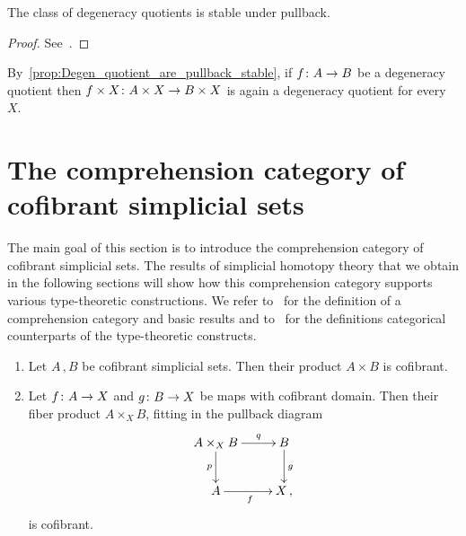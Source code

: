 \documentclass[reqno,10pt,a4paper,oneside,draft]{amsart}
\begin{document}
\begin{proposition}
\label{prop:Degen_quotient_are_pullback_stable}
The class of degeneracy quotients is stable under pullback. 
\end{proposition}

\begin{proof} See~\cite[Proposition 3.1.11]{henry2019qms}.
\end{proof}

By~\cref{prop:Degen_quotient_are_pullback_stable}, if $f \colon A \rightarrow B$ be a degeneracy quotient  then $f \times X \colon A \times X \rightarrow B \times X$ is again a degeneracy quotient for every $X$.


\section{The comprehension category of cofibrant simplicial sets}
\label{sec:basrp}

The main goal of this section is to introduce the comprehension category of cofibrant simplicial sets. The
results of simplicial homotopy theory that we obtain in the following sections will show how this 
comprehension category supports various type-theoretic constructions. We refer to~\cite{JacobsB:catltt} for the definition of a comprehension category and basic results and to~\cite{LumsdaineP:locuoc} for the
definitions categorical counterparts of the type-theoretic constructs.  


\begin{lemma}\label{lem:cofibrant_fiber_product} \hfill 
\begin{enumerate}[$(i)$] 
\item Let $A \, , B$ be cofibrant simplicial sets. Then their product $A \times B$ is cofibrant.
\item Let $f \colon A \to X$ and $g \colon B \to X$ be maps with  cofibrant domain. Then their
fiber product $A \times_X B$, fitting in the pullback diagram
\[
\xymatrix{
A \times_X B \ar[r]^-{q} \ar[d]_-{p} & B \ar[d]^g \\
A \ar[r]_f & X \, ,}
\]
is cofibrant.
\end{enumerate}
\end{lemma}
\end{document}

